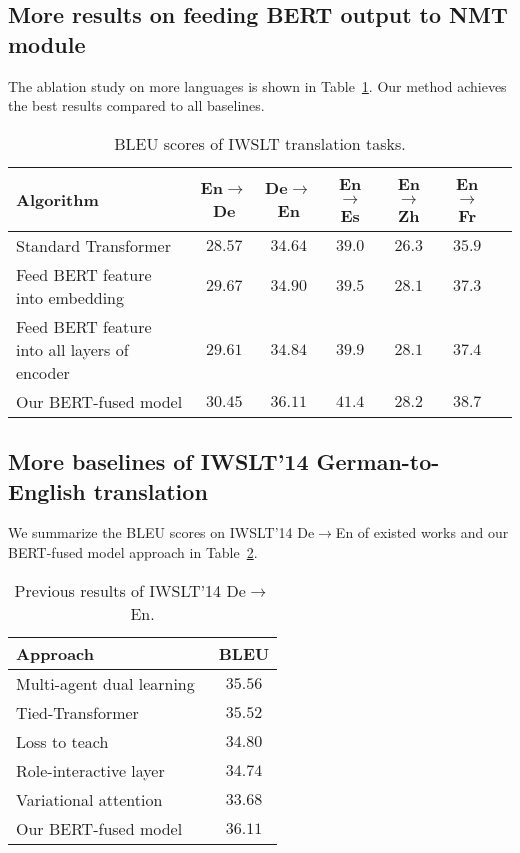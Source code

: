 \documentclass{article} \usepackage{iclr2020_conference,times}
\begin{document}
\subsection{More results on feeding BERT output to NMT module}\label{app:feeding}
The ablation study on more languages is shown in Table~\ref{tab:more_lang_ablation}. Our method achieves the best results compared to all baselines. 
\begin{table}[!htbp]
\centering
\caption{BLEU scores of IWSLT translation tasks.}
\begin{tabular}{lcccccc}
\toprule
Algorithm & En$\to$De & De$\to$En & En$\to$Es & En$\to$Zh &En$\to$Fr \\
\midrule
Standard Transformer & $28.57$ & $34.64$ &$39.0$ & $26.3$& $35.9$\\
Feed BERT feature into embedding & $29.67$ & $34.90$ & $39.5$ & $28.1$ & $37.3$  \\
Feed BERT feature into all layers of encoder &  $29.61$ & $34.84$ & $39.9$ & $28.1$ & $37.4$\\
Our BERT-fused model & $30.45$ & $36.11$ &$41.4$&$28.2$&$38.7$ \\
\bottomrule
\end{tabular}
\label{tab:more_lang_ablation}
\end{table}

\subsection{More baselines of IWSLT'14 German-to-English translation}\label{app:iwsltdeen}
We summarize the BLEU scores on IWSLT'14 De$\to$En of existed works and our BERT-fused model approach in Table~\ref{tab:summary:de2en:iwslt}. 


\begin{table}[!htbp]
\centering
\caption{Previous results of IWSLT'14 De$\to$En.}
\begin{tabular}{lc}
\toprule
Approach & BLEU \\ 
\midrule
Multi-agent dual learning~\citep{wang2018multi}  &  $35.56$ \\
Tied-Transformer~\citep{xia2019tied}  & $35.52$  \\
Loss to teach~\citep{wu2018learning} & $34.80$ \\
Role-interactive layer~\citep{weissenborn2019contextualized} & $34.74$ \\
Variational attention~\citep{deng2018latent} & $33.68$ \\
\midrule
Our BERT-fused model & $36.11$ \\
\bottomrule
\end{tabular}
\label{tab:summary:de2en:iwslt}
\end{table}
\end{document}

